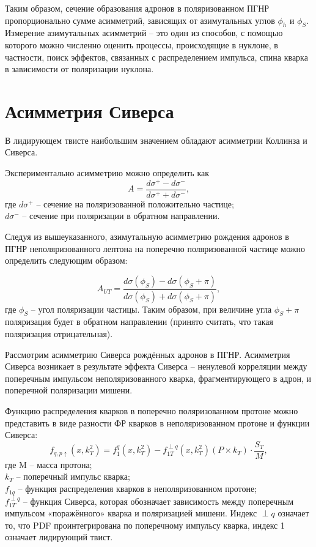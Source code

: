 \documentclass{extreport}
\begin{document}
Таким образом, сечение образования адронов в поляризованном ПГНР пропорционально сумме асимметрий, зависящих от азимутальных углов $\phi_h$ и $\phi_S$. Измерение азимутальных асимметрий -- это один из способов, с помощью которого можно численно оценить процессы, происходящие в нуклоне, в частности, поиск эффектов, связанных с распределением импульса, спина кварка в зависимости от поляризации нуклона.
\section{Асимметрия Сиверса}

В лидирующем твисте наибольшим значением обладают асимметрии Коллинза и Сиверса.

Экспериментально асимметрию можно определить как 
\begin{equation}
	A = \frac{d\sigma^{+}-d\sigma^{-}}{d\sigma^{+}+d\sigma^{-}},
\end{equation}
где $d\sigma^{+}$ -- сечение на поляризованной положительно частице; \\ $d\sigma^{-}$ -- сечение при поляризации в обратном направлении.

Следуя из вышеуказанного, азимутальную асимметрию рождения адронов в ПГНР неполяризованного лептона на поперечно поляризованной частице можно определить следующим образом:

\begin{equation}
	A_{UT} = \frac{d\sigma(\phi_S)-d\sigma(\phi_S+\pi)}{d\sigma(\phi_S)+d\sigma(\phi_S+\pi)},
\end{equation}
где $\phi_S$ -- угол поляризации частицы. Таким образом, при величине угла $\phi_S + \pi$ поляризация будет в обратном направлении (принято считать, что такая поляризация отрицательная).

Рассмотрим асимметрию Сиверса рождённых адронов в ПГНР. Асимметрия Сиверса возникает в результате эффекта Сиверса -- ненулевой корреляции между поперечным импульсом неполяризованного кварка, фрагментирующего в адрон, и поперечной поляризации мишени.  

Функцию распределения кварков в поперечно поляризованном протоне можно представить в виде разности ФР кварков в неполяризованном протоне и функции Сиверса:
\begin{equation}
	\label{eq:Sivers}
	f_{q,p\uparrow} (x,k^2_T )=f_1^q (x,k^2_T )-f_{1T}^{\perp q} (x,k^2_T )(P\times k_T ) \cdot \frac{S_T}{M},
\end{equation}
где M – масса протона; \\ $k_T$ – поперечный импульс кварка; \\ $f_{1q}$ – функция распределения кварков в неполяризованном протоне; \\ $f_{1T}^{\perp q}$ – функция Сиверса, которая обозначает зависимость между поперечным импульсом «поражённого» кварка и поляризацией мишени. Индекс $\perp q$ означает то, что PDF проинтегрирована по поперечному импульсу кварка, индекс 1 означает лидирующий твист.
\end{document}
